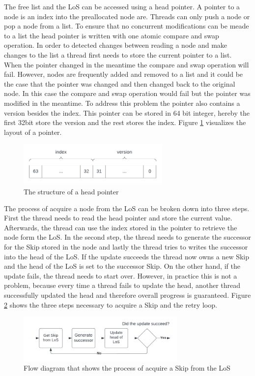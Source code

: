 \documentclass[sigconf,nonacm]{acmart}
\begin{document}
        The free list and the LoS can be accessed using a head pointer. A pointer to a node is an index into the preallocated node are. Threads can only push a node or pop a node from a list. To ensure that no concurrent modifications can be meade to a list the head pointer is written with one atomic compare and swap operation. In order to detected changes between reading a node and make changes to the list a thread first needs to store the current pointer to a list. When the pointer changed in the meantime the compare and swap operation will fail. However, nodes are frequently added and removed to a list and it could be the case that the pointer was changed and then changed back to the original node. In this case the compare and swap operation would fail but the pointer was modified in the meantime. To address this problem the pointer also contains a version besides the index. This pointer can be stored in 64 bit integer, hereby the first 32bit store the version and the rest stores the index. Figure \ref{fig:pointer} visualizes the layout of a pointer.
        \begin{figure}[h]
            \includegraphics[height=2.2cm]{figure4.pdf}
            \caption{The structure of a head pointer}
            \label{fig:pointer}
        \end{figure}  

        The process of acquire a node from the LoS can be broken down into three steps. First the thread needs to read the head pointer and store the current value. Afterwards, the thread can use the index stored in the pointer to retrieve the node form the LoS. In the second step, the thread needs to generate the successor for the Skip stored in the node and lastly the thread tries to writes the successor into the head of the LoS. If the update succeeds the thread now owns a new Skip and the head of the LoS is set to the successor Skip. On the other hand, if the update fails, the thread needs to start over. However, in practice this is not a problem, because every time a thread fails to update the head, another thread successfully updated the head and therefore overall progress is guaranteed. Figure \ref{fig:acquire} shows the three steps necessary to acquire a Skip and the retry loop.
        \begin{figure}[h]
            \includegraphics[height=2.4cm]{figure5.pdf}
            \caption{Flow diagram that shows the process of acquire a Skip from the LoS}
            \label{fig:acquire}
        \end{figure}
\end{document}
